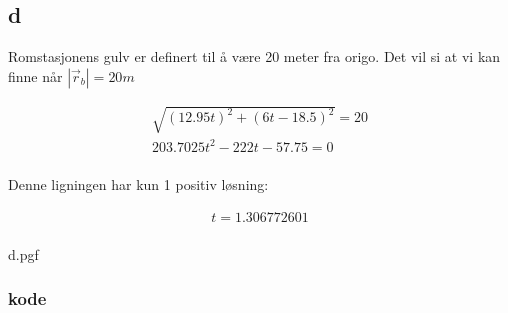 \subsection{d}

Romstasjonens gulv er definert til å være 20 meter fra origo. Det vil si at vi kan finne når $|\vec{r}_b| = 20m$

\begin{align}
\sqrt{(12.95 t)^2 + (6 t - 18.5)^2} = 20 \\[1em]
203.7025 t^2 - 222 t - 57.75 = 0 \\[1em]
\end{align}

Denne ligningen har kun 1 positiv løsning:

\begin{align}
t = 1.306772601 \\[1em]
\end{align}

{d.pgf}

\newpage

\subsubsection{kode}

